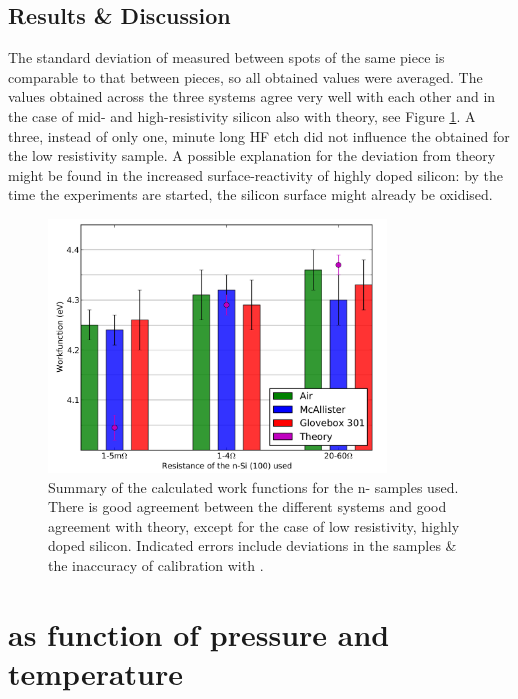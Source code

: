 \subsection{Results \& Discussion}
The standard deviation of measured \cpd{} between spots of the same piece is comparable to that between pieces, so all obtained values were averaged. The values obtained across the three systems agree very well with each other and in the case of mid- and high-resistivity silicon also with theory, see Figure \ref{fig:nsih}. A three,  instead of only one, minute long HF etch did not influence the \cpd{} obtained for the low resistivity sample. A possible explanation for the deviation from theory might be found in the increased surface-reactivity of highly doped silicon: by the time the experiments are started, the silicon surface might already be oxidised. 
\begin{figure}
\centering
	\includegraphics[width=0.8\textwidth]{./figs/Sih}
\caption{Summary of the calculated work functions for the n-\sih{} samples used. There is good agreement between the different systems and good agreement with theory, except for the case of low resistivity, highly doped silicon. Indicated errors include deviations in the samples \& the inaccuracy of calibration with \hopg{}.}
	\label{fig:nsih}
\end{figure}


\section{\cpd{} as function of pressure and temperature}
